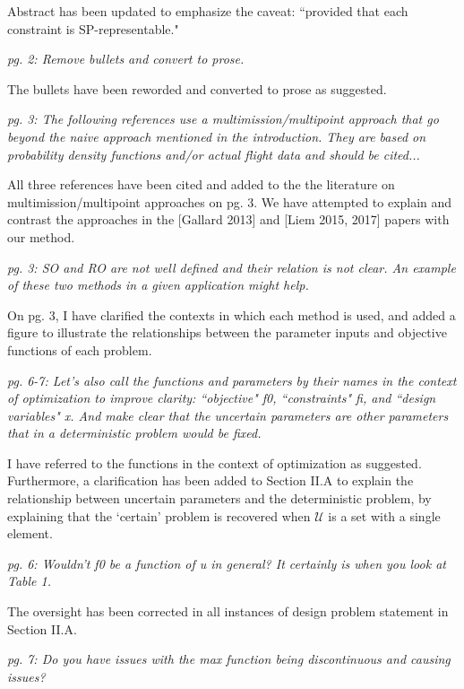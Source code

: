 \documentclass[11pt]{article}
\begin{document}
    Abstract has been updated to emphasize the caveat: ``provided that each constraint is SP-representable."
    \bigskip

    \textit{pg. 2: Remove bullets and convert to prose.}

    The bullets have been reworded and converted to prose as suggested.
    \bigskip

    \textit{pg. 3: The following references use a multimission/multipoint approach
    that go beyond the naive approach mentioned in the introduction.
    They are based on probability density functions and/or actual flight data and should be cited...}

    All three references have been cited and added to the the literature on multimission/multipoint approaches on pg. 3.
    We have attempted to explain and contrast the approaches in the [Gallard 2013] and [Liem 2015, 2017] papers
    with our method.
    \bigskip

    \textit{pg. 3: SO and RO are not well defined and their relation is not clear.
    An example of these two methods in a given application might help.}

    On pg. 3, I have clarified the contexts in which each method is used,
    and added a figure to illustrate the relationships between the parameter inputs
    and objective functions of each problem.
    \bigskip


    \textit{pg. 6-7: Let's also call the functions and parameters by their names in the context of optimization to improve clarity:
    ``objective" f0, ``constraints" fi, and ``design variables" x. And make clear that the uncertain parameters are other parameters that in a deterministic problem would be fixed.}

    I have referred to the functions in the context of optimization as suggested. Furthermore,
    a clarification has been added to Section II.A to explain the relationship between uncertain parameters and the
    deterministic problem, by explaining that the `certain' problem is
    recovered when $\mathcal{U}$ is a set with a single element.
    \bigskip


    \textit{pg. 6: Wouldn't f0 be a function of u in general? It certainly is when you look at Table 1.}

    The oversight has been corrected in all instances of design problem statement in Section II.A.
    \bigskip

    \textit{pg. 7: Do you have issues with the max function being discontinuous and causing issues?}
\end{document}
